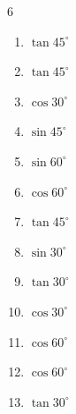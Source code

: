 \begin{multicols}{6}
\begin{enumerate}
  \item $\displaystyle \tan{45^\circ}$

        \phantom{$\displaystyle =1$}

  \item $\displaystyle \tan{45^\circ}$

        \phantom{$\displaystyle =1$}

  \item $\displaystyle \cos{30^\circ}$


  \item $\displaystyle \sin{45^\circ}$


  \item $\displaystyle \sin{60^\circ}$


  \item $\displaystyle \cos{60^\circ}$


  \item $\displaystyle \tan{45^\circ}$

        \phantom{$\displaystyle =1$}

  \item $\displaystyle \sin{30^\circ}$


  \item $\displaystyle \tan{30^\circ}$


  \item $\displaystyle \cos{30^\circ}$


  \item $\displaystyle \cos{60^\circ}$


\columnbreak %

  \item $\displaystyle \cos{60^\circ}$


  \item $\displaystyle \tan{30^\circ}$


\end{enumerate}
\end{multicols}
